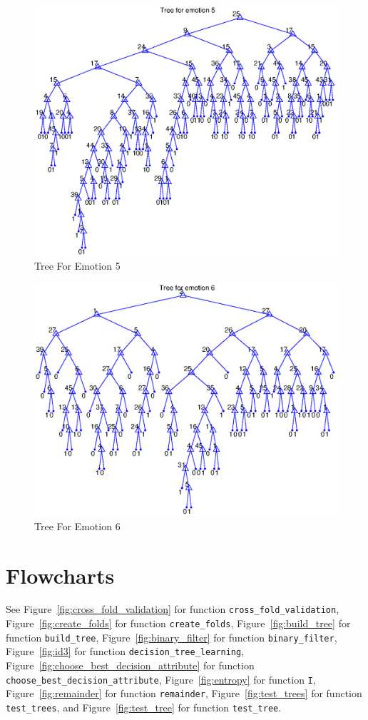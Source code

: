 \documentclass[10pt,a4paper]{article}
\begin{document}
\begin{figure}[!hb]
	\centering
	\includegraphics[width=\textwidth]{trees/tree5.eps}
     \caption{Tree For Emotion 5}
     \label{fig:tree5}
\end{figure}
\begin{figure}[!ht]
	\centering
	\includegraphics[width=\textwidth]{trees/tree6.eps}
     \caption{Tree For Emotion 6}
     \label{fig:tree6}
\end{figure}

\section{Flowcharts}
See Figure~\ref{fig:cross_fold_validation} for function {\tt cross\_fold\_validation}, Figure~\ref{fig:create_folds} for function {\tt create\_folds}, Figure~\ref{fig:build_tree} for function {\tt build\_tree}, 
Figure~\ref{fig:binary_filter} for function {\tt binary\_filter}, Figure~\ref{fig:id3} for function {\tt decision\_tree\_learning}, Figure~\ref{fig:choose_best_decision_attribute} for function {\tt choose\_best\_decision\_attribute},
Figure~\ref{fig:entropy} for function {\tt I}, Figure~\ref{fig:remainder} for function {\tt remainder}, Figure~\ref{fig:test_trees} for function {\tt test\_trees}, and Figure~\ref{fig:test_tree} for function {\tt test\_tree}.
\end{document}
